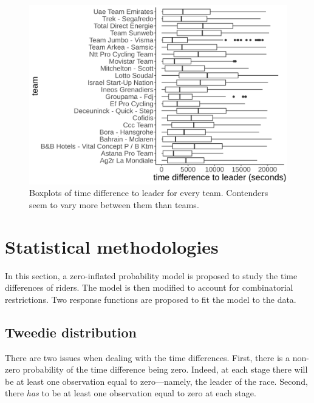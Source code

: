 \documentclass[aos,preprint]{imsart}
\begin{document}
\begin{figure}[h]
  \centering
  \includegraphics[scale=0.5]{fig/timediff_team.png}
  \caption{Boxplots of time difference to leader for every team. Contenders seem to vary more between them than teams.}
  \label{fig:timediff_team}
\end{figure}





\section{Statistical methodologies} \label{sec:stats}

In this section, a zero-inflated probability model is proposed to study the time differences of riders. The model is then modified to account for combinatorial restrictions. Two response functions are proposed to fit the model to the data.

\FloatBarrier

\subsection{Tweedie distribution}

There are two issues when dealing with the time differences. First, there is a non-zero probability of the time difference being zero. Indeed, at each stage there will be at least one observation equal to zero---namely, the leader of the race. Second, there \textit{has} to be at least one observation equal to zero at each stage. \\
\end{document}
